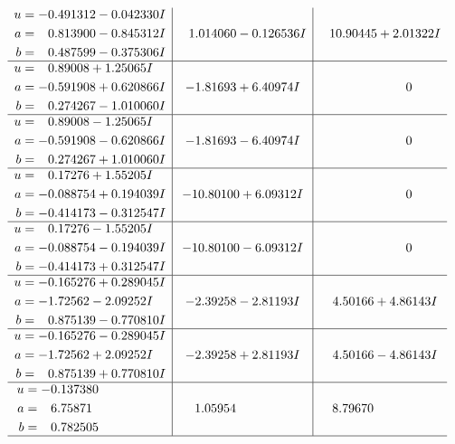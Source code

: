 \documentclass[1p]{elsarticle_modified}
\theoremstyle{definition}
\begin{document}
$$\begin{array}{c|c|c}
\begin{aligned}
u &= -0.491312 - 0.042330 I \\
a &= \phantom{-}0.813900 - 0.845312 I \\
b &= \phantom{-}0.487599 - 0.375306 I\end{aligned}
 & \phantom{-}1.014060 - 0.126536 I & \phantom{-}10.90445 + 2.01322 I \\ \hline\begin{aligned}
u &= \phantom{-}0.89008 + 1.25065 I \\
a &= -0.591908 + 0.620866 I \\
b &= \phantom{-}0.274267 - 1.010060 I\end{aligned}
 & -1.81693 + 6.40974 I & \phantom{-0.000000 } 0 \\ \hline\begin{aligned}
u &= \phantom{-}0.89008 - 1.25065 I \\
a &= -0.591908 - 0.620866 I \\
b &= \phantom{-}0.274267 + 1.010060 I\end{aligned}
 & -1.81693 - 6.40974 I & \phantom{-0.000000 } 0 \\ \hline\begin{aligned}
u &= \phantom{-}0.17276 + 1.55205 I \\
a &= -0.088754 + 0.194039 I \\
b &= -0.414173 - 0.312547 I\end{aligned}
 & -10.80100 + 6.09312 I & \phantom{-0.000000 } 0 \\ \hline\begin{aligned}
u &= \phantom{-}0.17276 - 1.55205 I \\
a &= -0.088754 - 0.194039 I \\
b &= -0.414173 + 0.312547 I\end{aligned}
 & -10.80100 - 6.09312 I & \phantom{-0.000000 } 0 \\ \hline\begin{aligned}
u &= -0.165276 + 0.289045 I \\
a &= -1.72562 - 2.09252 I \\
b &= \phantom{-}0.875139 - 0.770810 I\end{aligned}
 & -2.39258 - 2.81193 I & \phantom{-}4.50166 + 4.86143 I \\ \hline\begin{aligned}
u &= -0.165276 - 0.289045 I \\
a &= -1.72562 + 2.09252 I \\
b &= \phantom{-}0.875139 + 0.770810 I\end{aligned}
 & -2.39258 + 2.81193 I & \phantom{-}4.50166 - 4.86143 I \\ \hline\begin{aligned}
u &= -0.137380\phantom{ +0.000000I} \\
a &= \phantom{-}6.75871\phantom{ +0.000000I} \\
b &= \phantom{-}0.782505\phantom{ +0.000000I}\end{aligned}
 & \phantom{-}1.05954\phantom{ +0.000000I} & \phantom{-}8.79670\phantom{ +0.000000I}\\
 \hline 
 \end{array}$$\newpage\newpage\renewcommand{\arraystretch}{1}
\end{document}
